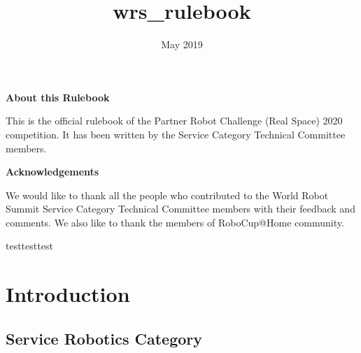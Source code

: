 \documentclass{article}
\title{wrs_rulebook}
\date{May 2019}
\makeatletter
\newcommand\abtname{About this Rulebook}
\newenvironment{about}{%
       \titlepage
       \null\vfil
       \@beginparpenalty\@lowpenalty
       \begin{center}%
         \bfseries \abtname
         \@endparpenalty\@M
       \end{center}}%
      {\par\vfil\null\endtitlepage}
\newenvironment{about}{%
       \if@twocolumn
         \section*{\abstractname}%
       \else
         \small
         \begin{center}%
           {\bfseries \abtname\vspace{-.5em}\vspace{\z@}}%
         \end{center}%
         \quotation
       \fi}
       {\if@twocolumn\else\endquotation\fi}
\newcommand\ackname{Acknowledgements}
\newenvironment{acknowledgements}{%
       \titlepage
       \null\vfil
       \@beginparpenalty\@lowpenalty
       \begin{center}%
         \bfseries \ackname
         \@endparpenalty\@M
       \end{center}}%
      {\par\vfil\null\endtitlepage}
\newenvironment{acknowledgements}{%
       \if@twocolumn
         \section*{\abstractname}%
       \else
         \small
         \begin{center}%
           {\bfseries \ackname\vspace{-.5em}\vspace{\z@}}%
         \end{center}%
         \quotation
       \fi}
       {\if@twocolumn\else\endquotation\fi}
\makeatother
\begin{document}
\begin{titlepage}
	\centering
	{\scshape\LARGE World Robot Summit 2020 \par}
	\vspace{1cm}
	{\scshape\Large Partner Robot Challenge\par}
	\vspace{1.5cm}
	{\huge\bfseries Real Space\par}
	\vspace{2cm}
	{\Large\itshape Rules \& Regulations\par}
	\vfill
	\texttt{[image: \{images/real01.png]}}
	\vfill
	
{\large Version 1.0.0 (January 1, 2020)}
\end{titlepage}

\newpage

\begin{about}

This is the official rulebook of the Partner Robot Challenge (Real Space) 2020 competition. It has been written by the Service Category Technical Committee members.

\end{about}

\begin{acknowledgements}

We would like to thank all the people who contributed to the World Robot Summit Service Category Technical Committee members with their feedback and comments. We also like to thank the members of RoboCup@Home community.

testtesttest
\end{acknowledgements}

\newpage
{}
\tableofcontents{}
\singlespacing
\newpage

\section{Introduction}

\subsection{Service Robotics Category}
\end{document}
